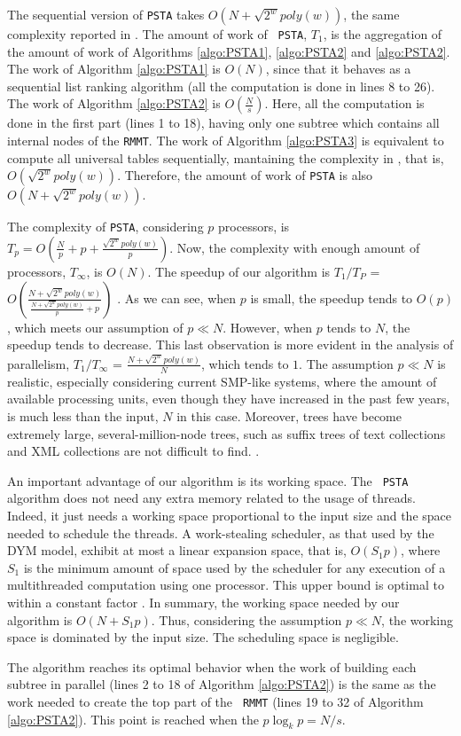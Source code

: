 The sequential version of {\tt PSTA} takes $O(N+\sqrt{2^{w}}poly(w))$,
the same complexity reported in
\cite{Navarro:2014:FFS:2620785.2601073}. The amount of work of {\tt
PSTA}, $T_1$, is the aggregation of the amount of work of Algorithms \ref{algo:PSTA1},
\ref{algo:PSTA2} and \ref{algo:PSTA2}. The work of Algorithm \ref{algo:PSTA1} is $O(N)$,
since that it behaves as a sequential list ranking algorithm (all the computation is
done in lines 8 to 26). The work of Algorithm \ref{algo:PSTA2} is $O(\frac{N}{s})$. Here,
all the computation is done in the first part (lines 1 to 18), having only one
subtree which contains all internal nodes of the {\tt RMMT}. The work of Algorithm \ref{algo:PSTA3} is equivalent to compute all universal tables sequentially, mantaining
the complexity in \cite{Navarro:2014:FFS:2620785.2601073}, that is, $O(\sqrt{2^{w}}poly(w))$. Therefore, the amount of work of {\tt PSTA} is also
$O(N+\sqrt{2^{w}}poly(w))$.


 The complexity of {\tt PSTA},
considering $p$ processors, is $T_p =
O(\frac{N}{p}+p+\frac{\sqrt{2^{w}}poly(w)}{p})$. Now, the complexity
with enough amount of processors, $T_\infty$, is $O(N)$. The speedup
of our algorithm is $T_1/T_P$ =
$O(\frac{N+\sqrt{2^{w}}poly(w)}{\frac{N+\sqrt{2^{w}}poly(w)}{p}+p})$
. As we can see,
when $p$ is small, the speedup tends to $O(p)$, which meets our
assumption of $p\ll N$. However, when $p$ tends to $N$, the speedup
tends to decrease. This last observation is more evident in the
analysis of parallelism, $T_1/T_{\infty}$ =
$\frac{N+\sqrt{2^{w}}poly(w)}{N}$, which tends to $1$. The assumption
$p\ll N$ is realistic, especially considering current SMP-like
systems, where the amount of available processing units, even though
they have increased in the past few years, is much less than the
input, $N$ in this case. Moreover, trees have become extremely large,
several-million-node trees, such as suffix trees of text collections
and XML collections are not difficult to find. .

An important advantage of our algorithm is its working space. The {\tt
PSTA} algorithm does not need any extra memory related to the usage of
threads. Indeed, it just needs a working space proportional to the
input size and the space needed to schedule the threads. A
work-stealing scheduler, as that used by the DYM model, exhibit at
most a linear expansion space, that is, $O(S_1p)$, where $S_1$ is the
minimum amount of space used by the scheduler for any execution of a
multithreaded computation using one processor. This upper bound is
optimal to within a constant factor
\cite{Blumofe:1999:SMC:324133.324234}. In summary, the working space
needed by our algorithm is $O(N+S_1p)$. Thus, considering the
assumption $p\ll N$, the working space is dominated by the input
size. The scheduling space is negligible.

The algorithm reaches its optimal behavior when the work of building
each subtree in parallel (lines 2 to 18 of Algorithm \ref{algo:PSTA2})
is the same as the work needed to create the top part of the {\tt
RMMT} (lines 19 to 32 of Algorithm \ref{algo:PSTA2}). This point is
reached when the $p\log_{k}p=N/s$. 